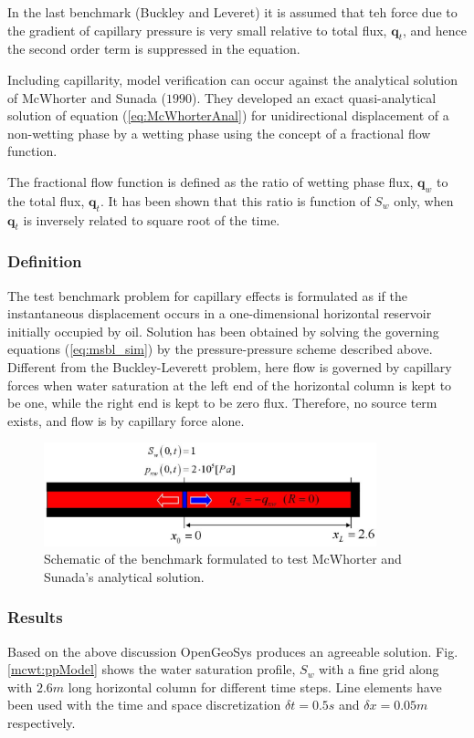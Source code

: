 In the last benchmark (Buckley and Leveret) it is assumed that teh force due to the gradient of capillary pressure is very small relative to total flux, $\mathbf q_t$, and hence the second order term is suppressed in the equation.

Including capillarity, model verification can occur against the analytical solution of McWhorter and Sunada ($1990$). They developed an exact quasi-analytical solution of equation (\ref{eq:McWhorterAnal}) for unidirectional displacement of a non-wetting phase by a wetting phase using the concept of a fractional flow function.

The fractional flow function is defined as the ratio of wetting phase flux, $\mathbf q_w$ to the total flux, $\mathbf q_t$. It has been shown that this ratio is function of $S_w$ only, when $\mathbf q_t$ is inversely related to square root of the time.

\subsubsection*{Definition}
The test benchmark problem for capillary effects is formulated as if the instantaneous displacement occurs in a one-dimensional horizontal reservoir initially occupied by oil. Solution has been obtained by solving the governing equations (\ref{eq:msbl_sim}) by the pressure-pressure scheme described above. Different from the Buckley-Leverett problem, here flow is governed by capillary forces when water saturation at the left end of the horizontal column is kept to be one, while the right end is kept to be zero flux. Therefore, no source term exists, and flow is by capillary force alone.

\begin{figure}[!tbh]
\begin{center}
\includegraphics[height=3cm]{chapter_13/figures/fig_13_1_9}
\end{center}
\caption{Schematic of the benchmark formulated to test McWhorter and Sunada's analytical solution.}
\label{mcwt:config}
\end{figure}

\subsubsection*{Results}
Based on the above discussion OpenGeoSys produces an agreeable solution. Fig. \ref{mcwt:ppModel} shows the water saturation profile, $S_w$ with a fine grid along with $2.6m$ long horizontal column for different time steps. Line elements have been used with the time and space discretization $\delta t=0.5s$ and $\delta x=0.05m$ respectively.

